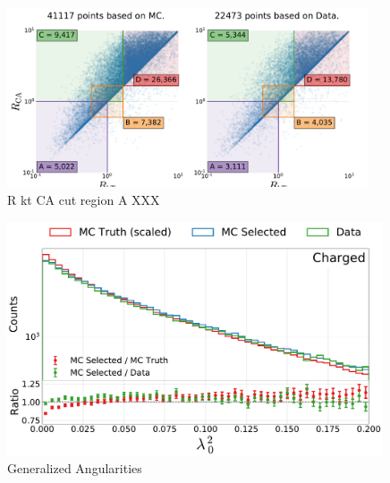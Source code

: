 \begin{figure}
  \centerfloat
  \includegraphics[width=0.95\textwidth, trim=0 0 0 30, clip, page=2]{figures/quarks/gtag-R_kt_CA_overview-down_sample=1.00-ML_vars=vertex-selection=b-ejet_min=4-n_iter_RS_lgb=99-n_iter_RS_xgb=9-cdot_cut=0.90-version=19-njet=4}
  \caption[R kt CA cut region A  XXX \TODO]
          {R kt CA cut region A XXX \TODO
          } 
  \label{fig:q:R_kt_CA_cut_A}
\end{figure}


\begin{figure}
  \centerfloat
  \includegraphics[width=0.99\textwidth, trim=0 0 0 0, clip, page=1]{figures/quarks/generalized_angularities_cha-down_sample=1.00-ML_vars=vertex-selection=b-ejet_min=4-n_iter_RS_lgb=99-n_iter_RS_xgb=9-cdot_cut=0.90-version=19.pdf}
  \caption[Generalized Angularities \TODO]
          {Generalized Angularities \TODO
          }
  \label{fig:q:genalized_angularities}
\end{figure}
